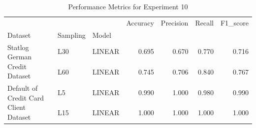 \begin{table}
\caption{Performance Metrics for Experiment 10}
\label{tab:experiment_10_results}
\begin{tabular}{lllrrrr}
\toprule
 &  &  & Accuracy & Precision & Recall & F1\_score \\
Dataset & Sampling & Model &  &  &  &  \\
\midrule
\multirow[t]{2}{*}{Statlog German Credit Dataset} & L30 & LINEAR & 0.695 & 0.670 & 0.770 & 0.716 \\
\cline{2-7}
 & L60 & LINEAR & 0.745 & 0.706 & 0.840 & 0.767 \\
\cline{1-7} \cline{2-7}
\multirow[t]{2}{*}{Default of Credit Card Client Dataset} & L5 & LINEAR & 0.990 & 1.000 & 0.980 & 0.990 \\
\cline{2-7}
 & L15 & LINEAR & 1.000 & 1.000 & 1.000 & 1.000 \\
\cline{1-7} \cline{2-7}
\bottomrule
\end{tabular}
\end{table}
